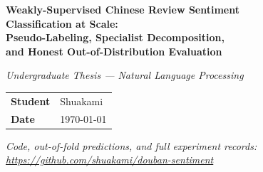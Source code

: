 \documentclass[11pt,a4paper]{article}
\begin{document}
\begin{titlepage}
\thispagestyle{empty}
\begin{center}
\vspace*{2.0cm}
{\LARGE\bfseries Weakly-Supervised Chinese Review Sentiment\\[6pt]
Classification at Scale:\\[6pt]
Pseudo-Labeling, Specialist Decomposition,\\[6pt]
and Honest Out-of-Distribution Evaluation}\par
\vspace{0.9cm}
{\large\itshape Undergraduate Thesis --- Natural Language Processing}
\par
\vspace{2.6cm}
\begin{tabular}{ll}
\textbf{Student}    & Shuakami \\
\textbf{Date}       & \today \\
\end{tabular}
\vfill
{\footnotesize\itshape
Code, out-of-fold predictions, and full experiment records:
\url{https://github.com/shuakami/douban-sentiment}}
\end{center}
\end{titlepage}
\end{document}
